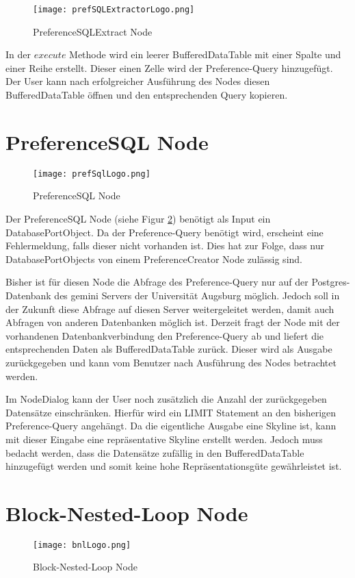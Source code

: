 \begin{figure}[H]
	\centering
	\texttt{[image: prefSQLExtractorLogo.png]}
	\caption{PreferenceSQLExtract Node}
	\label{img:prefSQLExtractorLogo}
\end{figure}

In der $execute$ Methode wird ein leerer BufferedDataTable mit einer Spalte und einer Reihe erstellt. Dieser einen Zelle wird der Preference-Query hinzugefügt. Der User kann nach erfolgreicher Ausführung des Nodes diesen BufferedDataTable öffnen und den entsprechenden Query kopieren.
\section{PreferenceSQL Node}
\label{ch:Implementierung:sec:prefSQL}
\begin{figure}[H]
	\centering
	\texttt{[image: prefSqlLogo.png]}
	\caption{PreferenceSQL Node}
	\label{img:prefSQLLogo}
\end{figure}

Der PreferenceSQL Node (siehe Figur \ref{img:prefSQLLogo}) benötigt als Input ein DatabasePortObject. Da der Preference-Query benötigt wird, erscheint eine Fehlermeldung, falls dieser nicht vorhanden ist. Dies hat zur Folge, dass nur DatabasePortObjects von einem PreferenceCreator Node zulässig sind. 

Bisher ist für diesen Node die Abfrage des Preference-Query nur auf der Postgres-Datenbank des gemini Servers der Universität Augsburg möglich. Jedoch soll in der Zukunft diese Abfrage auf diesen Server weitergeleitet werden, damit auch Abfragen von anderen Datenbanken möglich ist.
Derzeit fragt der Node mit der vorhandenen Datenbankverbindung den Preference-Query ab und liefert die entsprechenden Daten als BufferedDataTable zurück. Dieser wird als Ausgabe zurückgegeben und kann vom Benutzer nach Ausführung des Nodes betrachtet werden.

Im NodeDialog kann der User noch zusätzlich die Anzahl der zurückgegeben Datensätze einschränken. Hierfür wird ein LIMIT Statement an den bisherigen Preference-Query angehängt. Da die eigentliche Ausgabe eine Skyline ist, kann mit dieser Eingabe eine repräsentative Skyline erstellt werden. Jedoch muss bedacht werden, dass die Datensätze zufällig in den BufferedDataTable hinzugefügt werden und somit keine hohe Repräsentationsgüte gewährleistet ist.
\section{Block-Nested-Loop Node}
\label{ch:Implementierung:sec:bnlNode}
\begin{figure}[H]
	\centering
	\texttt{[image: bnlLogo.png]}
	\caption{Block-Nested-Loop Node}
	\label{img:bnlLogo}
\end{figure}

